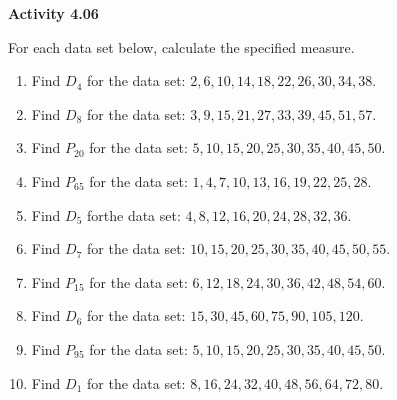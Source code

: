 \vspace{0.3ex}
\noindent\textbf{Activity 4.06}

\vspace{0.2ex}

For each data set below, calculate the specified measure.  

\begin{enumerate}
    \item Find \(D_4\) for the data set: \(2, 6, 10, 14, 18, 22, 26, 30, 34, 38\).  
    \item Find \(D_8\) for the data set: \(3, 9, 15, 21, 27, 33, 39, 45, 51, 57\).  
    \item Find \(P_{20}\) for the data set: \(5, 10, 15, 20, 25, 30, 35, 40, 45, 50\).  
    \item Find \(P_{65}\) for the data set: \(1, 4, 7, 10, 13, 16, 19, 22, 25, 28\).  
    \item  Find \(D_{5}\) forthe data set: \(4, 8, 12, 16, 20, 24, 28, 32, 36\).  
    \item Find \(D_7\) for the data set: \(10, 15, 20, 25, 30, 35, 40, 45, 50, 55\).  
    \item Find \(P_{15}\) for the data set: \(6, 12, 18, 24, 30, 36, 42, 48, 54, 60\).  
    \item Find \(D_{6}\) for the data set: \(15, 30, 45, 60, 75, 90, 105, 120\).  
    \item Find \(P_{95}\) for the data set: \(5, 10, 15, 20, 25, 30, 35, 40, 45, 50\).  
    \item Find \(D_{1}\) for the data set: \(8, 16, 24, 32, 40, 48, 56, 64, 72, 80\).  
\end{enumerate}
